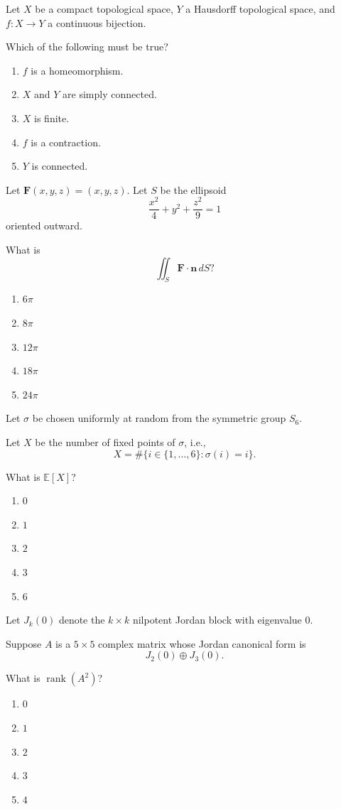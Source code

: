\begin{exercise}
Let $X$ be a compact topological space,
$Y$ a Hausdorff topological space,
and $f:X\to Y$ a continuous bijection.

Which of the following must be true?
\begin{enumerate}[label=(\Alph*)]
\item $f$ is a homeomorphism.
\item $X$ and $Y$ are simply connected.
\item $X$ is finite.
\item $f$ is a contraction.
\item $Y$ is connected.
\end{enumerate}
\end{exercise}

\begin{exercise}
Let $\mathbf F(x,y,z)=(x,y,z)$.
Let $S$ be the ellipsoid
\[
\frac{x^2}{4}+y^2+\frac{z^2}{9}=1
\]
oriented outward.

What is
\[
\iint_S\mathbf F\cdot\mathbf n\,dS?
\]
\begin{enumerate}[label=(\Alph*)]
\item $6\pi$
\item $8\pi$
\item $12\pi$
\item $18\pi$
\item $24\pi$
\end{enumerate}
\end{exercise}

\begin{exercise}
Let $\sigma$ be chosen uniformly
at random from the symmetric group $S_6$.

Let $X$ be the number of fixed points
of $\sigma$, i.e.,
\[
X=\#\{i\in\{1,\dots,6\}:\sigma(i)=i\}.
\]

What is $\mathbb E[X]$?
\begin{enumerate}[label=(\Alph*)]
\item $0$
\item $1$
\item $2$
\item $3$
\item $6$
\end{enumerate}
\end{exercise}

\begin{exercise}
Let $J_k(0)$ denote the $k\times k$
nilpotent Jordan block with eigenvalue $0$.

Suppose $A$ is a $5\times5$ complex matrix
whose Jordan canonical form is
\[
J_2(0)\oplus J_3(0).
\]

What is $\operatorname{rank}(A^2)$?
\begin{enumerate}[label=(\Alph*)]
\item $0$
\item $1$
\item $2$
\item $3$
\item $4$
\end{enumerate}
\end{exercise}

